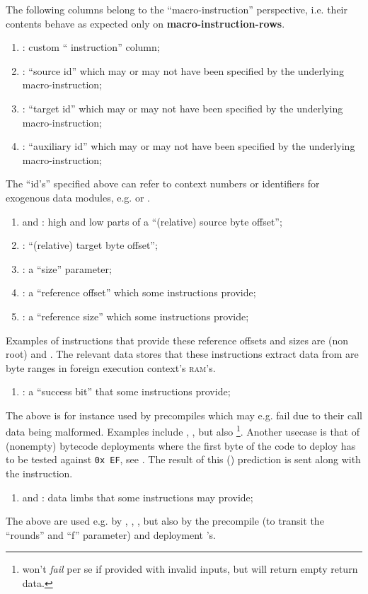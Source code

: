 The following columns belong to the ``macro-instruction'' perspective, i.e. their contents behave as expected only on 
\textbf{macro-instruction-rows}. 
\begin{enumerate}
	\item \macroInst{}:
		custom ``\mmuMod{} instruction'' column;
	\item \macroSrcId{}:
		``source id'' which may or may not have been specified by the underlying macro-instruction;
	\item \macroTgtId{}:
		``target id'' which may or may not have been specified by the underlying macro-instruction;
	\item \macroAuxId{}:
		``auxiliary id'' which may or may not have been specified by the underlying macro-instruction;
\end{enumerate}
The ``id's'' specified above can refer to context numbers or identifiers for exogenous data modules, e.g. \kecStamp{} or \cfi{}.
\begin{enumerate}[resume]
	\item \macroSrcOffsetHi{} and \macroSrcOffsetLo{}:
		high and low parts of a ``(relative) source byte offset'';
	\item \macroTgtOffsetLo{}:
		``(relative) target byte offset'';
	\item \macroSize{}:
		a ``size'' parameter;
	\item \macroRefOffset{}:
		a ``reference offset'' which some instructions provide;
	\item \macroRefSize{}:  
		a ``reference size'' which some instructions provide;
\end{enumerate}
Examples of instructions that provide these reference offsets and sizes are (non root)  and .
The relevant data stores that these instructions extract data from are byte ranges in foreign execution context's \textsc{ram}'s.
\begin{enumerate}[resume]
	\item \macroSuccessBit{}:
		a ``success bit'' that some instructions provide;
\end{enumerate}
The above is for instance used by precompiles which may e.g. fail due to their call data being malformed.
Examples include , ,  but also \footnote{ won't \emph{fail} per se if provided with invalid inputs, but will return empty return data.}.
Another usecase is that of (nonempty) bytecode deployments where the first byte of the code to deploy has to be tested against \texttt{0x\,EF},
see \cite{EIP-3541}.
The result of this (\hubMod{}) prediction is sent along with the \mmuMod{} instruction.
\begin{enumerate}[resume]
	\item \macroLimbOne{} and \macroLimbTwo{}:
		data limbs that some instructions may provide;
\end{enumerate}
The above are used e.g. by
,
,
,
but also by the  precompile (to transit the ``rounds'' and ``f'' parameter)
and deployment 's.

